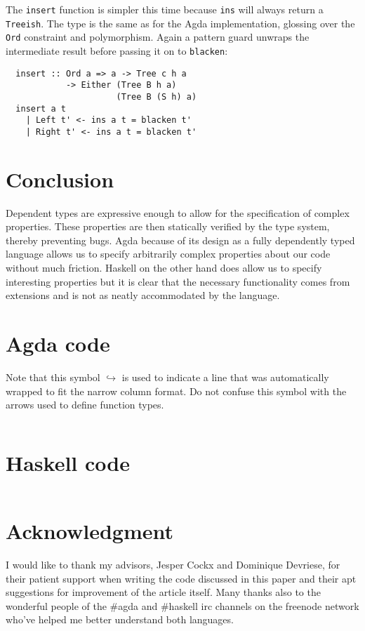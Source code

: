 \documentclass[journal, retainorgcmds]{IEEEtran}
\newcommand{\ihask}[1]{\texttt{#1}}
\begin{document}
The \ihask{insert} function is simpler this time because \ihask{ins} will
always return a \ihask{Treeish}.
The type is the same as for the Agda implementation, glossing over the
\ihask{Ord} constraint and polymorphism.
Again a pattern guard unwraps the intermediate result before passing it on to
\ihask{blacken}:

\begin{verbatim}
  insert :: Ord a => a -> Tree c h a
            -> Either (Tree B h a)
                      (Tree B (S h) a)
  insert a t
    | Left t' <- ins a t = blacken t'
    | Right t' <- ins a t = blacken t'
\end{verbatim}


\section{Conclusion}
Dependent types are expressive enough to allow for the specification of complex
properties.
These properties are then statically verified by the type system, thereby
preventing bugs.
Agda because of its design as a fully dependently typed language allows us to
specify arbitrarily complex properties about our code without much friction.
Haskell on the other hand does allow us to specify interesting properties but
it is clear that the necessary functionality comes from extensions and is not
as neatly accommodated by the language.

\appendices
\section{Agda code \label{app:agda}}
Note that this symbol {\tiny\ensuremath{\hookrightarrow}} is
used to indicate a line that was automatically wrapped to fit the narrow
column format. Do not confuse this symbol with the arrows used to define
function types.
\inputminted[fontsize=\small,breaklines]{agda}{../RedBlackTree.agda}
 

\section{Haskell code \label{app:haskell}}
\inputminted[fontsize=\small,breaklines]{haskell}{../RedBlackTree.hs}

\section*{Acknowledgment}
I would like to thank my advisors, Jesper Cockx and Dominique Devriese, for
their patient support when writing the code discussed in this paper and their
apt suggestions for improvement of the article itself.
Many thanks also to the wonderful people of the \#agda and \#haskell irc
channels on the freenode network who've helped me better understand both
languages.



\end{document}
